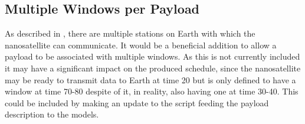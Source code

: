 \subsection*{Multiple Windows per Payload}\label{ssec:multi_window}
As described in , there are multiple stations on Earth with which the nanosatellite can communicate. It would be a beneficial addition to allow a payload to be associated with multiple windows. As this is not currently included it may have a significant impact on the produced schedule, since the nanosatellite may be ready to transmit data to Earth at time 20 but is only defined to have a window at time 70-80 despite of it, in reality, also having one at time 30-40. This could be included by making an update to the script feeding the payload description to the models.

